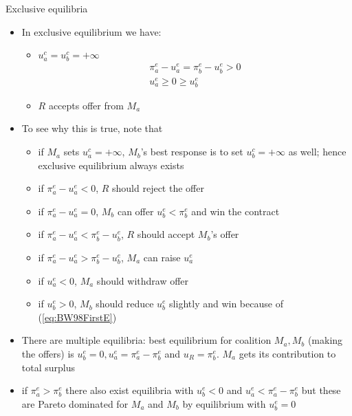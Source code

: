 \documentclass[11pt,english]{beamer}
\begin{document}
\begin{frame}[allowframebreaks]{Exclusive equilibria}
  \begin{itemize}
  \item In exclusive equilibrium we have:
    \begin{itemize}
    \item $u^c_a =u^c_b = +\infty$
      \begin{eqnarray}
        \label{eq:BW98FirstE}
        \pi_a^e -u_a^e = \pi_b^e -u_b^e >0 \\
        \label{eq:BW98SecondE}
        u_a^e \geq 0 \geq u_b^e
      \end{eqnarray}
    \item $R$ accepts offer from $M_a$
    \end{itemize}
  \item To see why this is true, note that
    \begin{itemize}
    \item if $M_a$ sets $u_a^c = +\infty$, $M_b$'s best response is to
      set $u_b^c = +\infty$ as well; hence exclusive equilibrium
      always exists
    \item if $\pi_a^e - u_a^e <0$, $R$ should reject the offer
    \item if $\pi_a^e - u_a^e =0$, $M_b$ can offer $u_b^e < \pi_b^e$
      and win the contract
    \item if $\pi_a^e - u_a^e < \pi_b^e -u_b^e $, $R$ should accept
      $M_b$'s offer
    \item if $\pi_a^e - u_a^e > \pi_b^e -u_b^e $, $M_a$ can raise $u_a^e$
    \item if $u_a^e <0$, $M_a$ should withdraw offer
    \item if $u_b^e >0$, $M_b$ should reduce $u_b^e$ slightly and win
      because of (\ref{eq:BW98FirstE})
    \end{itemize}
  \item There are multiple equilibria: best equilibrium for coalition
    $M_a,M_b$ (making the offers) is $u^e_b=0,u_a^e=\pi_a^e-\pi_b^e$
    and $u_R = \pi^e_b$. $M_a$ gets its contribution to total surplus
  \item if $\pi_a^e > \pi_b^e$ there also exist equilibria with $u_b^e
    <0$ and $u_a^e < \pi_a^e-\pi_b^e$ but these are Pareto dominated
    for $M_a$ and $M_b$ by equilibrium with $u_b^e =0$
  \end{itemize}
\end{frame}
\end{document}
